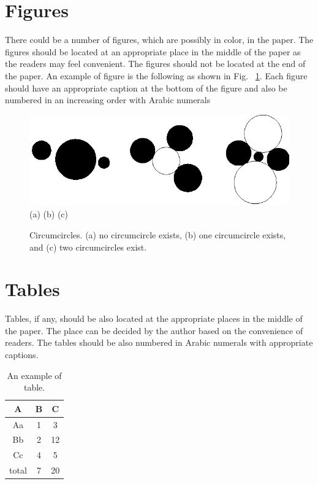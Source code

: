 \documentclass[10pt]{article}
\begin{document}
\section{Figures}
There could be a number of figures, which are possibly in color, in the paper. The figures should be located at an appropriate place in the middle of the paper as the readers may feel convenient. The figures should not be located at the end of the paper. An example of figure is the following as shown in Fig. ~\ref{fig1}. Each figure should have an appropriate caption at the bottom of the figure and also be numbered in an increasing order with Arabic numerals

\begin{figure}[htb]
\begin{center}
\includegraphics[width=0.6\columnwidth]{fig1.eps}\\
(a) \hspace{2cm} (b)\hspace{2cm} (c)
\caption{Circumcircles. (a) no circumcircle exists, (b) one
circumcircle exists, and (c) two circumcircles exist.}
\label{fig1}
\end{center}
\end{figure}

\section{Tables}
Tables, if any, should be also located at the appropriate places in the middle of the paper. The place can be decided by the author based on the convenience of readers. The tables should be also numbered in Arabic numerals with appropriate captions.
\begin{table}[htbp]
\begin{center}
\caption{An example of table.}
\vspace{2mm}
\label{tab1}
\begin{tabular}{ccc}
\hline
A & B & C \\
\hline
Aa & 1 & 3 \\
Bb & 2 & 12 \\
Cc & 4 & 5 \\
\hline
total & 7 & 20\\
\hline
\end{tabular}
\end{center}
\end{table}
\end{document}
